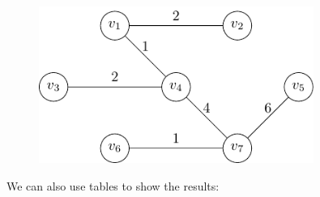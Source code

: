 \begin{minipage}{0.25\textwidth}
\begin{figure}[H]
  \centering
  \includegraphics[width=0.8\textwidth]{Figure/prim_algo_d7.pdf}
\end{figure}
\end{minipage}

We can also use tables to show the results: 

